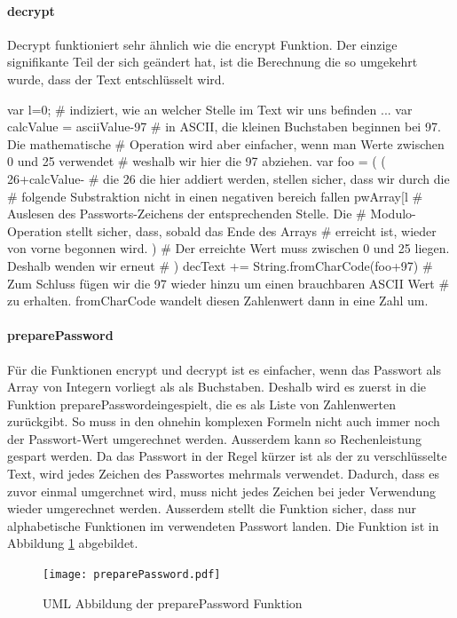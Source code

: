 \documentclass[11pt,paper=a4,final]{scrartcl}
\begin{document}
\paragraph{decrypt}
Decrypt funktioniert sehr \"ahnlich wie die encrypt Funktion. Der einzige
signifikante Teil der sich ge\"andert hat, ist die Berechnung die so umgekehrt
wurde, dass der Text entschl\"usselt wird.
\begin{verbatimtab}
  var l=0;
  # indiziert, wie an welcher Stelle im Text wir uns befinden
  ...
  var calcValue = asciiValue-97
  # in ASCII, die kleinen Buchstaben beginnen bei 97. Die mathematische
  # Operation wird aber einfacher, wenn man Werte zwischen 0 und 25 verwendet
  # weshalb wir hier die 97 abziehen.
  var foo =
  (
    (
      26+calcValue-
      # die 26 die hier addiert werden, stellen sicher, dass wir durch die
      # folgende Substraktion nicht in einen negativen bereich fallen
      pwArray[l%
      # Auslesen des Passworts-Zeichens der entsprechenden Stelle. Die
      # Modulo-Operation stellt sicher, dass, sobald das Ende des Arrays
      # erreicht ist, wieder von vorne begonnen wird.
    )
    # Der erreichte Wert muss zwischen 0 und 25 liegen. Deshalb wenden wir erneut
    # %
  )
  decText += String.fromCharCode(foo+97)
  # Zum Schluss f\"ugen wir die 97 wieder hinzu um einen brauchbaren ASCII Wert
  # zu erhalten. fromCharCode wandelt diesen Zahlenwert dann in eine Zahl um.
\end{verbatimtab}
\paragraph{preparePassword}
F\"ur die Funktionen encrypt und decrypt ist es einfacher, wenn das Passwort als
Array von Integern vorliegt als als Buchstaben. Deshalb wird es zuerst in die
Funktion \glqq preparePassword\grqq eingespielt, die es als Liste von
Zahlenwerten zur\"uckgibt. So muss in den ohnehin komplexen Formeln nicht auch
immer noch der Passwort-Wert umgerechnet werden. Ausserdem kann so
Rechenleistung gespart werden. Da das Passwort in der Regel k\"urzer ist als der
zu verschl\"usselte Text, wird jedes Zeichen des Passwortes mehrmals verwendet.
Dadurch, dass es zuvor einmal umgerchnet wird, muss nicht jedes Zeichen bei
jeder Verwendung wieder umgerechnet werden. Ausserdem stellt die Funktion
sicher, dass nur alphabetische Funktionen im verwendeten Passwort landen. Die
Funktion ist in Abbildung \ref{fig:preparePassword} \glqq
{}\grqq abgebildet.
\begin{figure}[h!]
  \centering
  \texttt{[image: preparePassword.pdf]}
  \caption{UML Abbildung der preparePassword Funktion}
  \label{fig:preparePassword}
\end{figure}
\end{document}
